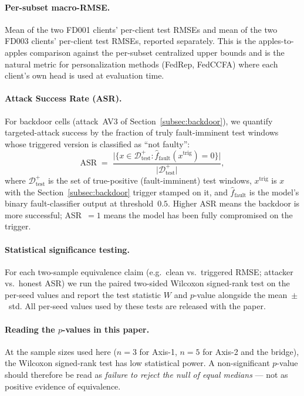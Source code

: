 \documentclass[a4paper,fleqn,doubleblind]{cas-sc}
\begin{document}
\paragraph{Per-subset macro-RMSE.}
Mean of the two FD001 clients' per-client test RMSEs and mean of
the two FD003 clients' per-client test RMSEs, reported separately.
This is the apples-to-apples comparison against the per-subset
centralized upper bounds and is the natural metric for
personalization methods (FedRep, FedCCFA) where each client's own
head is used at evaluation time.

\paragraph{Attack Success Rate (ASR).}
For backdoor cells (attack~AV3 of
Section~\ref{subsec:backdoor}), we quantify targeted-attack success
by the fraction of truly fault-imminent test windows whose triggered
version is classified as ``not faulty'':
\begin{equation}
    \mathrm{ASR}
    \;=\; \frac{\bigl|\{ x \in \mathcal{D}_{\text{test}}^{+} : \hat{f}_{\mathrm{fault}}(x^{\text{trig}}) = 0 \}\bigr|}
                {\bigl|\mathcal{D}_{\text{test}}^{+}\bigr|},
    \label{eq:asr}
\end{equation}
where $\mathcal{D}_{\text{test}}^{+}$ is the set of true-positive
(fault-imminent) test windows, $x^{\text{trig}}$ is $x$ with the
Section~\ref{subsec:backdoor} trigger stamped on it, and
$\hat{f}_{\mathrm{fault}}$ is the model's binary fault-classifier
output at threshold~$0.5$. Higher ASR means the backdoor is more
successful; ASR~$= 1$ means the model has been fully compromised on
the trigger.

\paragraph{Statistical significance testing.}
For each two-sample equivalence claim (e.g.\ clean vs.\ triggered
RMSE; attacker vs.\ honest ASR) we run the paired two-sided
Wilcoxon signed-rank test on the per-seed values and report the
test statistic $W$ and $p$-value alongside the mean~$\pm$~std.
All per-seed values used by these tests are released with the
paper.

\paragraph{Reading the $p$-values in this paper.}
At the sample sizes used here ($n = 3$ for Axis-1, $n = 5$ for
Axis-2 and the bridge), the Wilcoxon signed-rank test has low
statistical power. A non-significant $p$-value should therefore be
read as \emph{failure to reject the null of equal medians} --- not
as positive evidence of equivalence.
\end{document}
